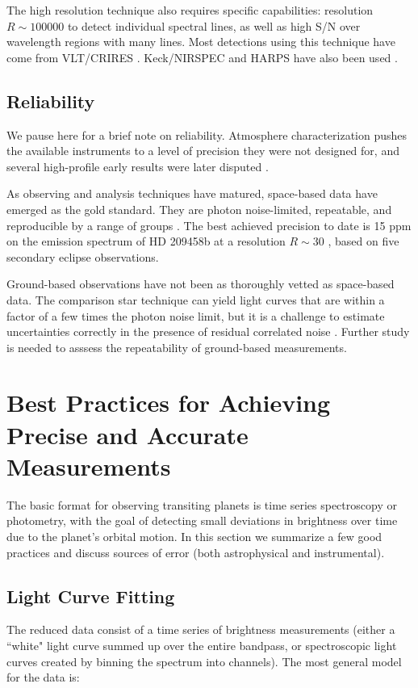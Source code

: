 \documentclass[graybox,natbib,nosecnum]{svmult}
\begin{document}
The high resolution technique also requires specific capabilities: resolution $R\sim100000$ to detect individual spectral lines, as well as high S/N over wavelength regions with many lines. Most detections using this technique have come from VLT/CRIRES \citep[e.g.][]{snellen10}.  Keck/NIRSPEC and HARPS have also been used \citep{lockwood14, martins15}.  
\subsection{Reliability}
We pause here for a brief note on reliability. Atmosphere characterization pushes the available instruments to a level of precision they were not designed for, and several high-profile early results were later disputed \citep[e.g.][]{tinetti07, swain08, gibson11}.

As observing and analysis techniques have matured, space-based data have emerged as the gold standard.  They are photon noise-limited, repeatable, and reproducible by a range of groups \citep[e.g.][]{deming13, kreidberg14a, ingalls16}. The best achieved precision to date is 15 ppm on the emission spectrum of HD 209458b at a resolution $R\sim 30$ \citep{line16}, based on five secondary eclipse observations.

Ground-based observations have not been as thoroughly vetted as space-based data.  The comparison star technique can yield light curves that are within a factor of a few times the photon noise limit, but it is a challenge to estimate uncertainties correctly in the presence of residual correlated noise \citep[e.g.][]{jordan13, beatty16}.  Further study is needed to asssess the repeatability of ground-based measurements. 

\section{Best Practices for Achieving Precise and Accurate Measurements}
The basic format for observing transiting planets is time series spectroscopy or photometry, with the goal of detecting small deviations in brightness over time due to the planet's orbital motion.  In this section we summarize a few good practices and discuss sources of error (both astrophysical and instrumental).

\subsection{Light Curve Fitting} 
The reduced data consist of a time series of brightness measurements (either a ``white" light curve summed up over the entire bandpass, or spectroscopic light curves created by binning the spectrum into channels).  The most general model for the data is:
\end{document}
